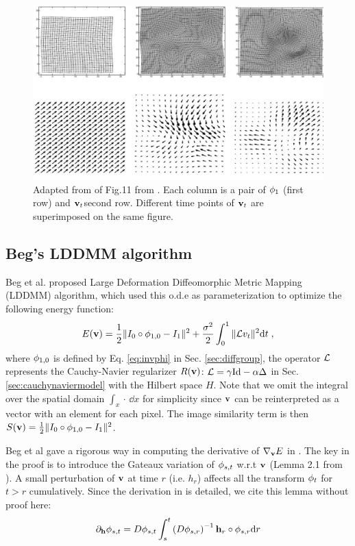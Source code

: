 \documentclass[letterpaper,12pt]{article}
\begin{document}
\begin{figure}
\includegraphics[width=1\textwidth]{fig/vt2}
\caption{\label{fig:vt}
Adapted from of Fig.11 from \cite{Beg2005Computing}. Each column is a pair of $\phi_1$ (first row) and $\mathbf{v}_t${second row}. Different time points of $\mathbf{v}_t$ are superimposed on the same figure.
}
\end{figure}


\subsection{Beg's LDDMM algorithm}

Beg et al. proposed Large Deformation Diffeomorphic Metric Mapping (LDDMM) algorithm, which used this o.d.e as parameterization to optimize the following energy function:
\begin{align}
E(\mathbf{v}) = \frac{1}{2} \| I_0 \circ \phi_{1,0} - I_1 \|^2 
+ 
\frac{\sigma^2}{2}\int_{0}^{1} \| \mathcal{L} v_t\|^2 \text{d} t \;,
\label{eq:lddmm}
\end{align}
where $\phi_{1,0}$ is defined by Eq. \ref{eq:invphi} in
Sec. \ref{sec:diffgroup}, the operator $\mathcal{L}$ represents the
Cauchy-Navier regularizer $R(\mathbf{v})$: $\mathcal{L} = \gamma \text{Id} - \alpha \Delta$
in Sec. \ref{sec:cauchynaviermodel} with the Hilbert space
$H$. Note that we omit the integral over the spatial domain $\int_x
\cdot\, \dd x$ for simplicity since $\mathbf{v}$ can be reinterpreted as a
vector with an element for each pixel. The image similarity term is
then $S(\mathbf{v}) = \frac{1}{2} \| I_0 \circ \phi_{1,0} - I_1 \|^2 $.

Beg et al gave a rigorous way in computing the derivative of $\nabla_{\mathbf{v}} E$ in \cite{Beg2005Computing}. The key in the proof is to introduce the Gateaux variation of $\phi_{s,t}$ w.r.t $\mathbf{v}$ (Lemma 2.1 from \cite{Beg2005Computing}). A small perturbation of $\mathbf{v}$ at time $r$ (i.e. $h_r$) affects all the transform $\phi_t$ for $t>r$ cumulatively. 
Since the derivation in \cite{Beg2005Computing} is detailed, we cite this lemma without proof here:
\begin{align}
\partial_{\mathbf{h}} \phi_{s,t} = D\phi_{s,t} 
\int_{s}^{t} 
\left( 
D \phi_{s,r}
\right)
^{-1} \mathbf{h}_r \circ \phi_{s, r} \text{d} r
\end{align}
\end{document}
